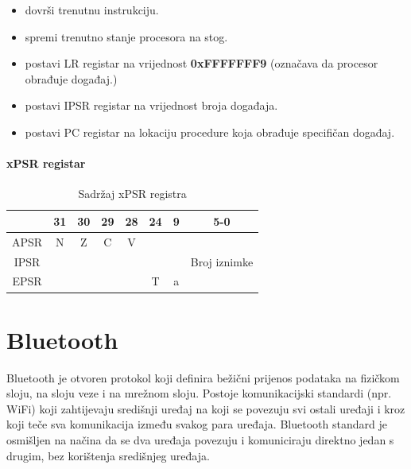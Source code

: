 \documentclass[times, utf8, diplomski]{diplomski}
\begin{document}
\begin{itemize}
  \item dovrši trenutnu instrukciju.
  \item spremi trenutno stanje procesora na stog.
  \item postavi LR registar na vrijednost \textbf{0xFFFFFFF9} (označava da procesor obrađuje događaj.)
  \item postavi IPSR registar na vrijednost broja događaja.
  \item postavi PC registar na lokaciju procedure koja obrađuje specifičan događaj.
\end{itemize}

\subsubsection{xPSR registar}

\begin{table}[H]
  \begin{center}
    \begin{tabular}{c|c|c|c|c||c||c||c|}
      \cline{2-8} & 31 & 30 & 29 & 28 & 24 & 9 & 5-0\\
      \hline
      \multicolumn{1}{|c|}{APSR} & N & Z & C & V & \multicolumn{3}{c|}{ } \\
      \hline
      \multicolumn{1}{|c|}{IPSR} & \multicolumn{6}{c||}{ } & Broj iznimke \\
      \hline
      \multicolumn{1}{|c|}{EPSR} & \multicolumn{4}{c||}{ } & T & a & \\
      \hline
    \end{tabular}
    \caption{Sadržaj xPSR registra}
  \end{center}
\end{table}

\newpage

\chapter{Bluetooth}

Bluetooth \cite{core41} je otvoren protokol koji definira bežični prijenos podataka na fizičkom sloju, na sloju veze i na mrežnom sloju.
Postoje komunikacijski standardi (npr. WiFi) koji zahtijevaju središnji uređaj na koji se povezuju svi ostali uređaji i kroz koji teče sva komunikacija između svakog para uređaja.
Bluetooth standard je osmišljen na načina da se dva uređaja povezuju i komuniciraju direktno jedan s drugim, bez korištenja središnjeg uređaja.
\end{document}
